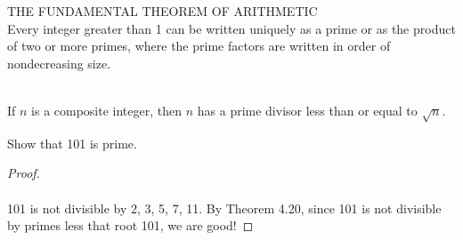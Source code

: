 \begin{thm}{THE FUNDAMENTAL THEOREM OF ARITHMETIC}$ $\\
Every integer greater than 1 can be written uniquely as a prime or as the product of two or more primes, where the prime factors are written in order of nondecreasing size.
\end{thm}
\begin{thm}$ $\\
If $n$ is a composite integer, then $n$ has a prime divisor less than or equal to $\sqrt{n}$.

\end{thm}
\begin{exmp}Show that 101 is prime.
\begin{proof} $ $\\
\vspace{2cm}
 $ $\\
 101 is not divisible by 2, 3, 5, 7, 11. By Theorem 4.20, since 101 is not divisible by primes less that root 101, we are good!
\end{proof}
\end{exmp}
